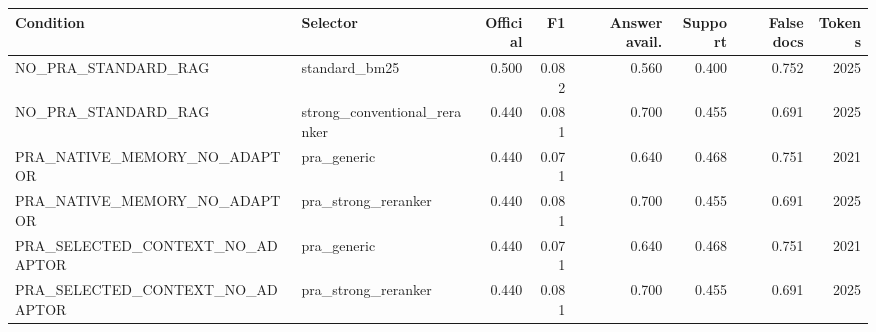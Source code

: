\begin{tabular}{llrrrrrr}
\toprule
Condition & Selector & Official & F1 & Answer avail. & Support & False docs & Tokens \\
\midrule
NO\_PRA\_STANDARD\_RAG & standard\_bm25 & 0.500 & 0.082 & 0.560 & 0.400 & 0.752 & 2025 \\
NO\_PRA\_STANDARD\_RAG & strong\_conventional\_reranker & 0.440 & 0.081 & 0.700 & 0.455 & 0.691 & 2025 \\
PRA\_NATIVE\_MEMORY\_NO\_ADAPTOR & pra\_generic & 0.440 & 0.071 & 0.640 & 0.468 & 0.751 & 2021 \\
PRA\_NATIVE\_MEMORY\_NO\_ADAPTOR & pra\_strong\_reranker & 0.440 & 0.081 & 0.700 & 0.455 & 0.691 & 2025 \\
PRA\_SELECTED\_CONTEXT\_NO\_ADAPTOR & pra\_generic & 0.440 & 0.071 & 0.640 & 0.468 & 0.751 & 2021 \\
PRA\_SELECTED\_CONTEXT\_NO\_ADAPTOR & pra\_strong\_reranker & 0.440 & 0.081 & 0.700 & 0.455 & 0.691 & 2025 \\
\bottomrule
\end{tabular}
